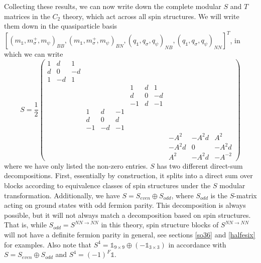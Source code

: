 \documentclass[12pt,a4paper]{article}
\newcounter{arrow}
\newcommand{\ra}{\rightarrow}
\newcommand{\unit}{\mathds{1}}
\newcommand\be            {\begin{equation}}
\newcommand\ee            {\end{equation}}
\begin{document}
Collecting these results, we can now write down the complete modular $S$ and $T$ matrices in the $C_2$ theory, 
which act across all spin structures. 
We will write them down in the quasiparticle 
basis $[(m_\unit,m_\sigma^+,m_\psi)_{BB},(m_\unit,m_\sigma^+,m_\psi)_{BN},(q_\unit,q_\sigma,q_\psi)_{NB},(q_\unit,q_\sigma,q_\psi)_{NN}]^T$, 
in which we can write
\be \label{modularS}
S = \frac{1}{2}\begin{pmatrix} 1 & d & 1 &			&&&			&&&			&& \\ 
					      d & 0 &-d &			&&&			&&&			&&\\
					      1&-d&1 & 			&&&			&&&			&&\\
						&&&				&&&			1&d&1&		&& \\
						&&&				&&&			d&0&-d&		&&\\ %
						&&&				&&&			-1&d&-1&		&&\\
						&&&				1&d&-1&		&&&			&&\\ %
						&&&				d&0&d&		&&&			&&\\
						&&&				-1&-d&-1&		&&&			&&\\ %
						&&&				&&&			&&&			-A^{2} & -A^{2}d & A^{2}\\
						&&&				&&&			&&&			-A^{2}d & 0 & -A^{2}d \\ 
						&&&				&&&			&&&			A^{2} & -A^{2}d & -A^{-2} \end{pmatrix}\ee		
where we have only listed the non-zero entries. 
$S$ has two different direct-sum decompositions. First, essentially by construction, 
it splits into a direct sum over blocks according to equivalence classes of spin structures 
under the $S$ modular transformation. 
Additionally, we have $S = S_{even} \oplus S_{odd}$, where $S_{odd}$ is the $S$-matrix 
acting on ground states with odd fermion parity.
This decomposition is always possible, but it will not always match a decomposition based 
on spin structures. 
That is, while $S_{odd} = S^{NN\ra NN}$ in this theory, spin structure blocks of $S^{NN\ra NN}$ 
will not have a definite fermion parity in general, see sections \ref{so36} and \ref{halfesix} for examples. 
Also note that $S^4 = \unit_{9\times9}\oplus(-\unit_{3\times3})$ in accordance with $S = S_{even} \oplus S_{odd}$ and $S^4=(-1)^F\unit$. 
\end{document}
